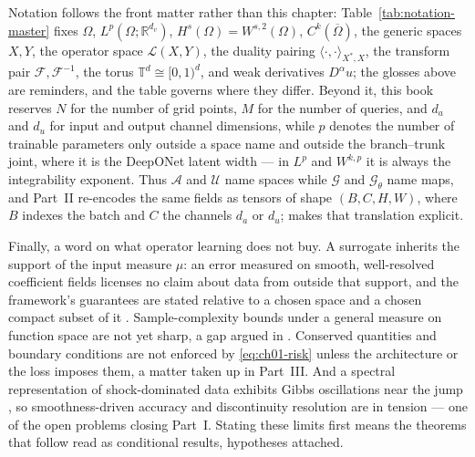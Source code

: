 Notation follows the front matter rather than this chapter: Table~\ref{tab:notation-master}
fixes $\Omega$, $L^{p}(\Omega;\mathbb{R}^{d_v})$,
$H^{s}(\Omega)=W^{s,2}(\Omega)$, $C^{k}(\overline{\Omega})$, the generic spaces $X, Y$,
the operator space $\mathcal{L}(X,Y)$, the duality pairing
$\langle \cdot, \cdot \rangle_{X^{*},X}$, the transform pair
$\mathcal{F}, \mathcal{F}^{-1}$, the torus $\mathbb{T}^{d} \cong [0,1)^{d}$, and weak
derivatives $D^{\alpha}u$; the glosses above are reminders, and the table governs where
they differ. Beyond it,
this book reserves $N$ for the number of grid points, $M$ for the number of queries, and
$d_a$ and $d_u$ for input and output channel dimensions, while $p$ denotes the number of
trainable parameters only outside a space name and outside the branch--trunk joint, where
it is the DeepONet latent width --- in $L^{p}$ and $W^{k,p}$ it is always the
integrability exponent. Thus $\mathcal{A}$ and $\mathcal{U}$ name spaces while
$\mathcal{G}$ and $\mathcal{G}_{\theta}$ name maps, and Part~II re-encodes the same
fields as tensors of shape $(B, C, H, W)$, where $B$ indexes the batch and $C$ the channels
$d_a$ or $d_u$;  makes that
translation explicit.

Finally, a word on what operator learning does not buy. A surrogate inherits the support of the
input measure $\mu$: an error measured on smooth, well-resolved coefficient fields licenses no claim
about data from outside that support, and the framework's guarantees are stated relative to a
chosen space and a chosen compact subset of it
\cite{kovachki2023neural}. Sample-complexity bounds under a general measure on function space
are not yet sharp, a gap argued in
. Conserved quantities and
boundary conditions are not enforced by \eqref{eq:ch01-risk} unless the architecture or the
loss imposes them, a matter taken up in Part~III. And a spectral representation of
shock-dominated data exhibits Gibbs oscillations near the jump
, so smoothness-driven accuracy and discontinuity resolution are in
tension --- one of the open problems closing Part~I. Stating these limits first means the
theorems that follow read as conditional results, hypotheses attached.

